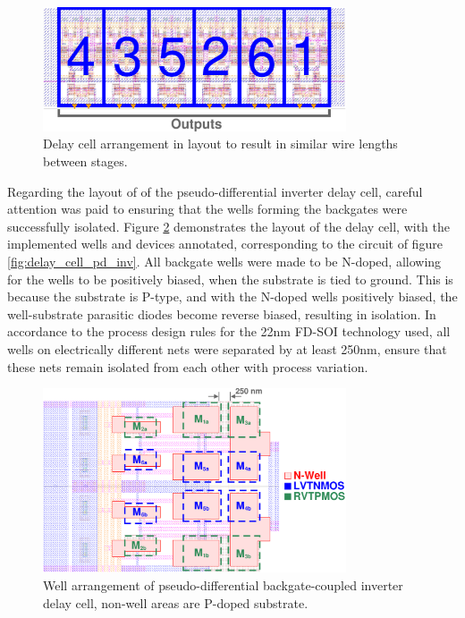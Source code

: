 			\begin{figure}[htb!]
			        \centering
			        \includegraphics[width=0.8\textwidth, angle=00]{./figs/design/slice_order}
			    \caption{Delay cell arrangement in layout to result in similar wire lengths between stages.}
			    \label{fig:slice_order}
			\end{figure}

		Regarding the layout of of the pseudo-differential inverter delay cell, careful attention was paid to ensuring that the wells forming the backgates were successfully isolated. Figure \ref{fig:wells} demonstrates the layout of the delay cell, with the implemented wells and devices annotated, corresponding to the circuit of figure \ref{fig:delay_cell_pd_inv}. All backgate wells were made to be N-doped, allowing for the wells to be positively biased, when the substrate is tied to ground. This is because the substrate is P-type, and with the N-doped wells positively biased, the well-substrate parasitic diodes become reverse biased, resulting in isolation. In accordance to the process design rules for the 22nm FD-SOI technology used, all wells on electrically different nets were separated by at least 250nm, ensure that these nets remain isolated from each other with process variation.
			\begin{figure}[htb!]
			        \centering
			        \includegraphics[width=0.8\textwidth, angle=0]{./figs/design/wells}
			    \caption{Well arrangement of pseudo-differential backgate-coupled inverter delay cell, non-well areas are P-doped substrate.}
			    \label{fig:wells}
			\end{figure}


